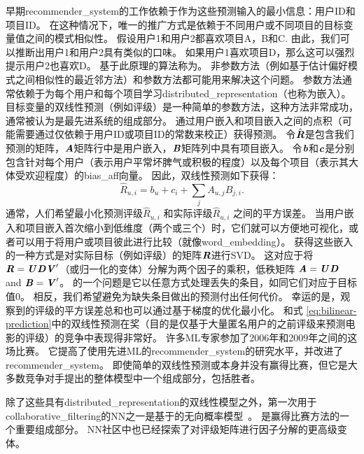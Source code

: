 早期\gls{recommender_system}的工作依赖于作为这些预测输入的最小信息：用户ID和项目ID。
在这种情况下，唯一的推广方式是依赖于不同用户或不同项目的目标变量值之间的模式相似性。
假设用户1和用户2都喜欢项目A，B和C.
由此，我们可以推断出用户1和用户2具有类似的口味。
如果用户1喜欢项目D，那么这可以强烈提示用户2也喜欢D。
基于此原理的算法称为。
非参数方法（例如基于估计偏好模式之间相似性的最近邻方法）和参数方法都可能用来解决这个问题。
参数方法通常依赖于为每个用户和每个项目学习\gls{distributed_representation}（也称为嵌入）。
目标变量的双线性预测（例如评级）是一种简单的参数方法，这种方法非常成功，通常被认为是最先进系统的组成部分。
通过用户嵌入和项目嵌入之间的点积（可能需要通过仅依赖于用户ID或项目ID的常数来校正）获得预测。
令$\hat{\boldsymbol{\mathit{R}}}$是包含我们预测的矩阵，$\boldsymbol{\mathit{A}}$矩阵行中是用户嵌入，$\boldsymbol{\mathit{B}}$矩阵列中具有项目嵌入。
令$\boldsymbol{\mathit{b}}$和$\boldsymbol{\mathit{c}}$是分别包含针对每个用户（表示用户平常坏脾气或积极的程度）以及每个项目（表示其大体受欢迎程度）的\gls{bias_aff}向量。
因此，双线性预测如下获得：
\begin{equation}
\label{eq:bilinear-prediction}
 \hat{R}_{u,i} = b_u + c_i + \sum_j A_{u,j} B_{j,i}.
\end{equation}
通常，人们希望最小化预测评级$\hat{R}_{u,i}$ 和实际评级$\hat{R}_{u,i}$ 之间的平方误差。
当用户嵌入和项目嵌入首次缩小到低维度（两个或三个）时，它们就可以方便地可视化，或者可以用于将用户或项目彼此进行比较（就像\gls{word_embedding}）。
获得这些嵌入的一种方式是对实际目标（例如评级）的矩阵$\boldsymbol{\mathit{R}}$进行\gls{SVD}。
这对应于将$\boldsymbol{\mathit{R}} = \boldsymbol{\mathit{U}} \boldsymbol{\mathit{D}} \boldsymbol{\mathit{V}}'$（或归一化的变体）分解为两个因子的乘积，低秩矩阵 $\boldsymbol{\mathit{A}}=\boldsymbol{\mathit{U}} \boldsymbol{\mathit{D}}$ and $\boldsymbol{\mathit{B}} = \boldsymbol{\mathit{V}}'$。
的一个问题是它以任意方式处理丢失的条目，如同它们对应于目标值0。
相反，我们希望避免为缺失条目做出的预测付出任何代价。
幸运的是，观察到的评级的平方误差总和也可以通过基于梯度的优化最小化。
和式 \eqref{eq:bilinear-prediction}中的双线性预测在奖（目的是仅基于大量匿名用户的之前评级来预测电影的评级）的竞争中表现得非常好\citep{bennett2007netflix}。
许多\gls{ML}专家参加了2006年和2009年之间的这场比赛。
它提高了使用先进\gls{ML}的\gls{recommender_system}的研究水平，并改进了\gls{recommender_system}。
即使简单的双线性预测或本身并没有赢得比赛，但它是大多数竞争对手提出的整体模型中一个组成部分，包括胜者\citep{BigChaos-Netflix2009,Koren09}。


除了这些具有\gls{distributed_representation}的双线性模型之外，第一次用于\gls{collaborative_filtering}的\gls{NN}之一是基于的无向概率模型~\citep{Salakhutdinov-2007-short}。
是赢得比赛方法的一个重要组成部分\citep{BigChaos-Netflix2009,Koren09}。
\gls{NN}社区中也已经探索了对评级矩阵进行因子分解的更高级变体\citep{Salakhutdinov2008-small}。


